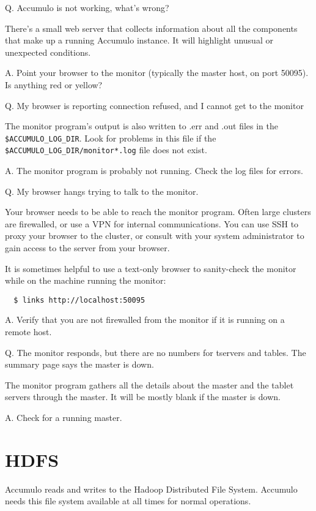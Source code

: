 Q. Accumulo is not working, what's wrong?

There's a small web server that collects information about all the
components that make up a running Accumulo instance. It will highlight
unusual or unexpected conditions.

A. Point your browser to the monitor (typically the master host, on port 50095).  Is anything red or yellow?

Q. My browser is reporting connection refused, and I cannot get to the monitor

The monitor program's output is also written to .err and .out files in
the \texttt{\$ACCUMULO\_LOG\_DIR}. Look for problems in this file if the
\texttt{\$ACCUMULO\_LOG\_DIR/monitor*.log} file does not exist.

A. The monitor program is probably not running.  Check the log files for errors.

Q. My browser hangs trying to talk to the monitor.

Your browser needs to be able to reach the monitor program.  Often
large clusters are firewalled, or use a VPN for internal
communications. You can use SSH to proxy your browser to the cluster,
or consult with your system administrator to gain access to the server
from your browser.

It is sometimes helpful to use a text-only browser to sanity-check the
monitor while on the machine running the monitor:

\small
\begin{verbatim}
  $ links http://localhost:50095
\end{verbatim}
\normalsize

A. Verify that you are not firewalled from the monitor if it is running on a remote host.

Q. The monitor responds, but there are no numbers for tservers and tables.  The summary page says the master is down.

The monitor program gathers all the details about the master and the
tablet servers through the master. It will be mostly blank if the
master is down.

A. Check for a running master.

\section{HDFS}

Accumulo reads and writes to the Hadoop Distributed File System.
Accumulo needs this file system available at all times for normal operations.

